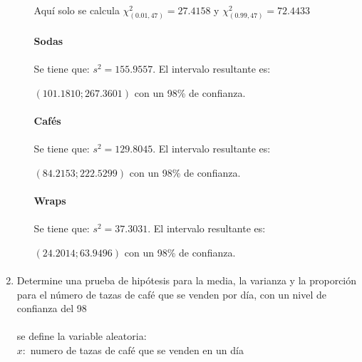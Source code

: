 \documentclass{article}
\begin{document}
\begin{enumerate}
\begin{enumerate}{}
			\paragraph{}Aquí solo se calcula $\chi_{(0.01,47)}^2=27.4158$ y $\chi_{(0.99,47)}^2=72.4433$          	
          	\paragraph*{}\textbf{Sodas}
			\paragraph{}Se tiene que: $s^2=155.9557$. El intervalo resultante es:
			\begin{center}$(101.1810;267.3601)$ con un 98\% de confianza.\end{center}			
          	\paragraph*{}\textbf{Cafés}
  			\paragraph{}Se tiene que: $s^2=129.8045$. El intervalo resultante es:      	
			\begin{center}$(84.2153;222.5299)$ con un 98\% de confianza.\end{center}          
          	\paragraph*{}\textbf{Wraps}
			\paragraph{}Se tiene que: $s^2=37.3031$. El intervalo resultante es:   	
			\begin{center}$(24.2014;63.9496)$ con un 98\% de confianza.\end{center}
      \paragraph{}
  \end{enumerate}
    \item Determine una prueba de hipótesis para la media, la varianza y la proporción para el número de tazas de café que se venden por día, con un nivel de confianza del 98%
    \paragraph{}
    se define la variable aleatoria:\\
    $x:$ numero de tazas de café que se venden en un día 

\end{enumerate}
\end{document}
